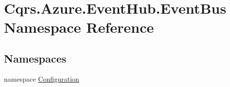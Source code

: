 \hypertarget{namespaceCqrs_1_1Azure_1_1EventHub_1_1EventBus}{}\section{Cqrs.\+Azure.\+Event\+Hub.\+Event\+Bus Namespace Reference}
\label{namespaceCqrs_1_1Azure_1_1EventHub_1_1EventBus}
\subsection*{Namespaces}
\begin{DoxyCompactItemize}
\item 
namespace \hyperlink{namespaceCqrs_1_1Azure_1_1EventHub_1_1EventBus_1_1Configuration}{Configuration}
\end{DoxyCompactItemize}
